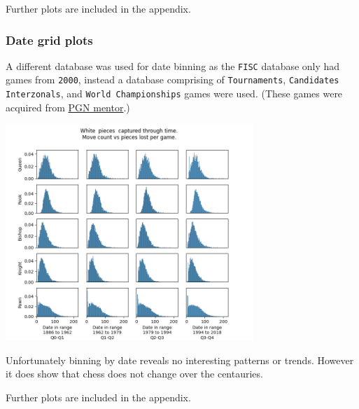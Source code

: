 \documentclass[11pt]{article}
\begin{document}
Further plots are included in the appendix.
\subsubsection{Date grid plots}
\label{sec:org492ff92}
A different database was used for date binning as the \texttt{FISC} database only had games from \texttt{2000}, instead a database comprising of \texttt{Tournaments}, \texttt{Candidates} \texttt{Interzonals}, and \texttt{World Championships} games were used. (These games were acquired from \href{https://www.pgnmentor.com/files.html\#events}{PGN mentor}.)

\begin{center}
\includegraphics[width=0.7\textwidth]{Images/_HIST_Queen_Rook_Bishop_Knight_Pawn_WHITE_DATE.png}
\end{center}

Unfortunately binning by date reveals no interesting patterns or trends. However it does show that chess does not change over the centauries.

Further plots are included in the appendix.

\newpage
\end{document}

